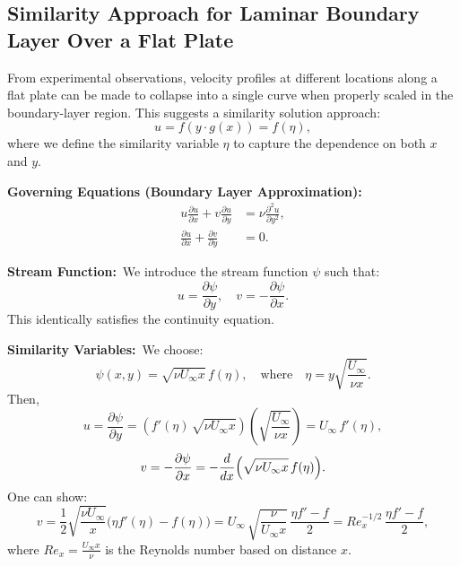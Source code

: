 \subsection*{Similarity Approach for Laminar Boundary Layer Over a Flat Plate}

From experimental observations, velocity profiles at different locations along a flat plate can be made to collapse into a single curve when properly scaled in the boundary-layer region. This suggests a similarity solution approach:
\[
  u = f(y\cdot g(x)) = f(\eta),
\]
where we define the similarity variable \(\eta\) to capture the dependence on both \(x\) and \(y\).

\bigskip
 \textbf{Governing Equations (Boundary Layer Approximation):}
\begin{align*}
  u\frac{\partial u}{\partial x} + v\frac{\partial u}{\partial y} &= \nu \frac{\partial^2 u}{\partial y^2}, \\
  \frac{\partial u}{\partial x} + \frac{\partial v}{\partial y} &= 0.
\end{align*}

 \textbf{Stream Function:}\
We introduce the stream function \(\psi\) such that:
\[
  u = \frac{\partial \psi}{\partial y}, \quad v = -\frac{\partial \psi}{\partial x}.
\]
This identically satisfies the continuity equation.

\bigskip
 \textbf{Similarity Variables:}\
We choose:
\[
  \psi(x,y) = \sqrt{\nu U_\infty x}\, f(\eta), \quad\text{where}\quad \eta = y \sqrt{\frac{U_\infty}{\nu x}}.
\]
Then,
\[
  u = \frac{\partial \psi}{\partial y} = \left( f'(\eta)\,\sqrt{\nu U_\infty x} \right)\!\left(\sqrt{\frac{U_\infty}{\nu x}} \right) = U_\infty\, f'(\eta),
\]
\[
  v = -\frac{\partial \psi}{\partial x} = -\frac{d}{dx}\Bigl(\sqrt{\nu U_\infty x}\, f(\eta)\Bigr).
\]
One can show:
\[
  v = \frac{1}{2}\sqrt{\frac{\nu U_\infty}{x}}\bigl(\eta f'(\eta) - f(\eta)\bigr) = U_\infty\,\sqrt{\frac{\nu}{U_\infty x}}\,\frac{\eta f' - f}{2} = Re^{-1/2}_x\,\frac{\eta f' - f}{2},
\]
where \( Re_x = \frac{U_\infty x}{\nu}\) is the Reynolds number based on distance \(x\).

